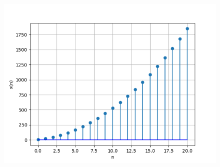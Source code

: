 \documentclass[journal,12pt,twocolumn]{IEEEtran}
\theoremstyle{remark}
\begin{document}
\begin{figure}[ht]
    \centering
	\includegraphics[width=1\columnwidth]{ncert-maths/11/9/5/22/graphs/digital2_graph.png}
    
	\label{fig:11.9.5.22.1}
\end{figure}
\end{document}
